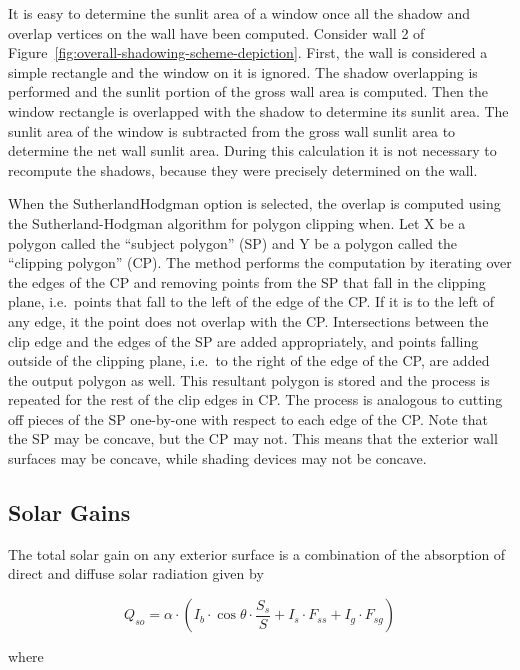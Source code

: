 It is easy to determine the sunlit area of a window once all the shadow and overlap vertices on the wall have been computed. Consider wall 2 of Figure~\ref{fig:overall-shadowing-scheme-depiction}. First, the wall is considered a simple rectangle and the window on it is ignored. The shadow overlapping is performed and the sunlit portion of the gross wall area is computed. Then the window rectangle is overlapped with the shadow to determine its sunlit area. The sunlit area of the window is subtracted from the gross wall sunlit area to determine the net wall sunlit area. During this calculation it is not necessary to recompute the shadows, because they were precisely determined on the wall.

When the SutherlandHodgman option is selected, the overlap is computed using the Sutherland-Hodgman algorithm for polygon clipping when. Let X be a polygon called the ``subject polygon'' (SP) and Y be a polygon called the ``clipping polygon'' (CP). The method performs the computation by iterating over the edges of the CP and removing points from the SP that fall in the clipping plane, i.e.~points that fall to the left of the edge of the CP. If it is to the left of any edge, it the point does not overlap with the CP. Intersections between the clip edge and the edges of the SP are added appropriately, and points falling outside of the clipping plane, i.e.~to the right of the edge of the CP, are added the output polygon as well. This resultant polygon is stored and the process is repeated for the rest of the clip edges in CP. The process is analogous to cutting off pieces of the SP one-by-one with respect to each edge of the CP. Note that the SP may be concave, but the CP may not. This means that the exterior wall surfaces may be concave, while shading devices may not be concave.

\subsection{Solar Gains}\label{solar-gains-000}

The total solar gain on any exterior surface is a combination of the absorption of direct and diffuse solar radiation given by

\begin{equation}
{Q_{so}} = \alpha \cdot \left( {{I_b}\cdot \cos \theta \cdot \frac{{{S_s}}}{S} + {I_s}\cdot {F_{ss}} + {I_g}\cdot {F_{sg}}} \right)
\end{equation}

where

